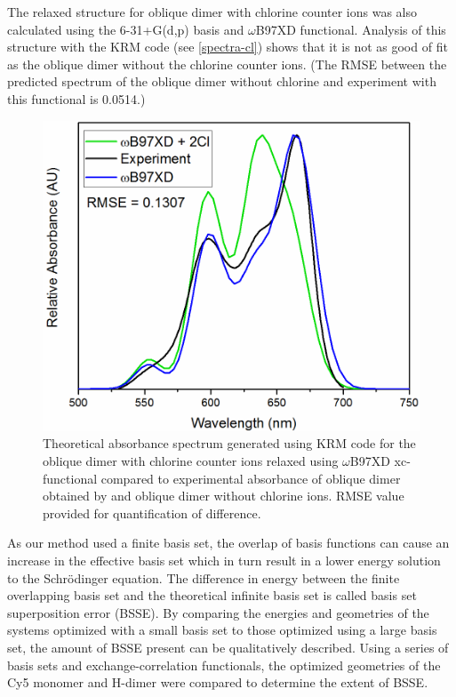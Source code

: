 The relaxed structure for oblique dimer with chlorine counter ions was also calculated using the 6-31+G(d,p) basis and $\omega$B97XD functional. Analysis of this structure with the KRM code (see \autoref{spectra-cl}) shows that it is not as good of fit as the oblique dimer without the chlorine counter ions. (The RMSE between the predicted spectrum of the oblique dimer without chlorine and experiment with this functional is 0.0514.)
\begin{figure}[h!]
  \centering
  \includegraphics[width=0.8\linewidth]{figures/pub1/ob-dimer-Cl-wB97XD.pdf}
  \caption[Theoretical absorbance spectrum generated using KRM code for the oblique dimer with chlorine counter ions relaxed using $\omega$B97XD xc-functional compared to experimental absorbance of oblique dimer obtained by Cannon and oblique dimer without chlorine ions. RMSE value provided for quantification of difference.]{Theoretical absorbance spectrum generated using KRM code for the oblique dimer with chlorine counter ions relaxed using $\omega$B97XD xc-functional compared to experimental absorbance of oblique dimer obtained by \citet{Cannon2017} and oblique dimer without chlorine ions. RMSE value provided for quantification of difference.}\label{spectra-cl}
\end{figure}

As our method used a finite basis set, the overlap of basis functions can cause an increase in the effective basis set which in turn result in a lower energy solution to the Schrödinger equation. The difference in energy between the finite overlapping basis set and the theoretical infinite basis set is called basis set superposition error (BSSE). By comparing the energies and geometries of the systems optimized with a small basis set to those optimized using a large basis set, the amount of BSSE present can be qualitatively described. Using a series of basis sets and exchange-correlation functionals, the optimized geometries of the Cy5 monomer and H-dimer were compared to determine the extent of BSSE. 

